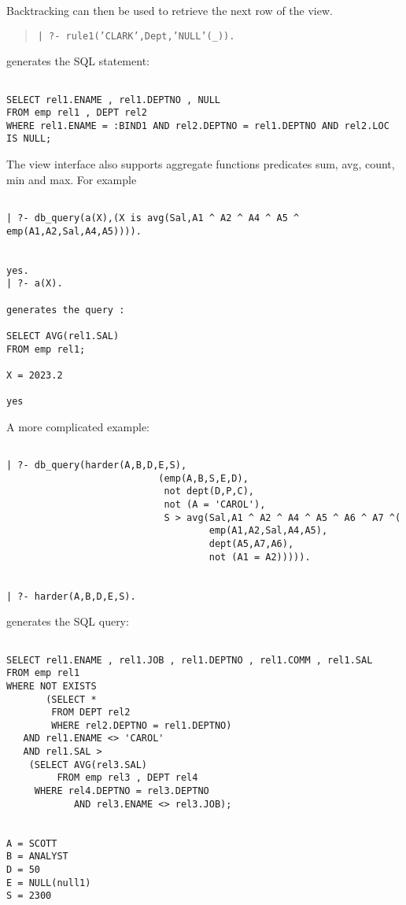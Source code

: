 Backtracking can then be used to retrieve the next row of the view.
\begin{quote}

{\tt | ?- rule1('CLARK',Dept,'NULL'(\_)).}
\end{quote}

generates the SQL statement:
\begin{verbatim}

SELECT rel1.ENAME , rel1.DEPTNO , NULL
FROM emp rel1 , DEPT rel2
WHERE rel1.ENAME = :BIND1 AND rel2.DEPTNO = rel1.DEPTNO AND rel2.LOC IS NULL;
\end{verbatim}

The view interface also supports aggregate functions predicates sum, avg,
count, min and max.  For example
\begin{verbatim}

| ?- db_query(a(X),(X is avg(Sal,A1 ^ A2 ^ A4 ^ A5 ^ emp(A1,A2,Sal,A4,A5)))).


yes.
| ?- a(X).

generates the query :

SELECT AVG(rel1.SAL)
FROM emp rel1;

X = 2023.2

yes
\end{verbatim}


A more complicated example:
\begin{verbatim}

| ?- db_query(harder(A,B,D,E,S), 
                           (emp(A,B,S,E,D),
                            not dept(D,P,C), 
                            not (A = 'CAROL'),
                            S > avg(Sal,A1 ^ A2 ^ A4 ^ A5 ^ A6 ^ A7 ^(
                                    emp(A1,A2,Sal,A4,A5),
                                    dept(A5,A7,A6),
                                    not (A1 = A2))))).


| ?- harder(A,B,D,E,S).
\end{verbatim}

generates the SQL query:
\begin{verbatim}

SELECT rel1.ENAME , rel1.JOB , rel1.DEPTNO , rel1.COMM , rel1.SAL
FROM emp rel1
WHERE NOT EXISTS
       (SELECT * 
        FROM DEPT rel2 
        WHERE rel2.DEPTNO = rel1.DEPTNO) 
   AND rel1.ENAME <> 'CAROL' 
   AND rel1.SAL > 
	(SELECT AVG(rel3.SAL) 
         FROM emp rel3 , DEPT rel4
	 WHERE rel4.DEPTNO = rel3.DEPTNO 
            AND rel3.ENAME <> rel3.JOB);


A = SCOTT
B = ANALYST
D = 50
E = NULL(null1)
S = 2300
\end{verbatim}

